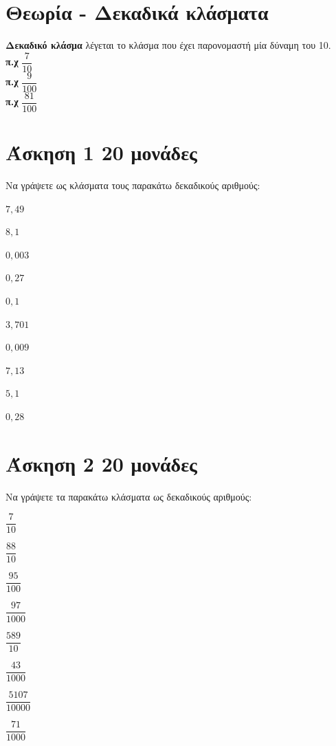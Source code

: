 \documentclass[a4paper,10pt]{report}
\begin{document}
\section*{Θεωρία - Δεκαδικά κλάσματα \hfill \small{}}
\textbf{Δεκαδικό κλάσμα} λέγεται το κλάσμα που έχει παρονομαστή μία δύναμη του 10.  \\
\textbf{π.χ} $\dfrac{7}{10}$\\
\textbf{π.χ} $\dfrac{9}{100}$\\
\textbf{π.χ} $\dfrac{81}{100}$\\



\section*{Άσκηση 1  \hfill \small{20 μονάδες}}
Να γράψετε ως κλάσματα τους παρακάτω δεκαδικούς αριθμούς:
\begin{enumerate}[1)]
\begin{multicols}{2}
 \item $7,49$
 \item $8,1$
 \item $0,003$
 \item $0,27$
 \item $0,1$
 \item $3,701$
 \item $0,009$
 \item $7,13$
 \item $5,1$
 \item $0,28$
\end{multicols}
\end{enumerate}

\section*{Άσκηση 2  \hfill \small{20 μονάδες}}
Να γράψετε τα παρακάτω κλάσματα ως δεκαδικούς αριθμούς:
\begin{enumerate}[1)]
\begin{multicols}{2}
 \item $\dfrac{7}{10}$
 \item $\dfrac{88}{10}$
 \item $\dfrac{95}{100}$
 \item $\dfrac{97}{1000}$
 \item $\dfrac{589}{10}$
 \item $\dfrac{43}{1000}$
 \item $\dfrac{5107}{10000}$
 \item $\dfrac{71}{1000}$
\end{multicols}
\end{enumerate}
\end{document}
